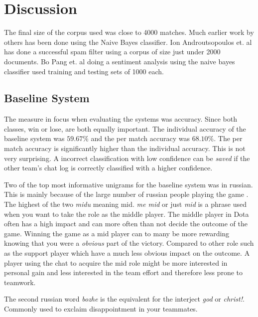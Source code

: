 \documentclass[12pt,a4paper]{article}
\begin{document}


\section{Discussion}
The final size of the corpus used was close to 4000 matches.
Much earlier work by others has been done using the Naive Bayes classifier.
Ion Androutsopoulos et. al \cite{spam} has done a successful
spam filter using a corpus of size just under 2000 documents.
Bo Pang et. al \cite{sentiment} doing a sentiment analysis
using the naive bayes classifier used training and testing sets of 1000 each.

\subsection{Baseline System}
The measure in focus when evaluating the systems was accuracy. Since both classes, win or lose,
are both equally important.
The individual accuracy of the baseline system was $59.67\%$ and the per match accuracy was $68.10\%$.
The per match accuracy is significantly higher than the individual accuracy.
This is not very surprising.
A incorrect classification with low confidence can be \textit{saved} if the other team's chat log
is correctly classified with a higher confidence.

Two of the top most informative unigrams for the baseline system was in russian.
This is mainly because of the large number of russian people playing the game \cite{ruski}.
The highest of the two \textit{midu} meaning mid. 
\textit{me mid} or just \textit{mid} is a phrase used when you want to take the role as the
middle player. The middle player in Dota often has a high impact and can more often than not
decide the outcome of the game. Winning the game as a mid player can to many be more rewarding
knowing that you were a \textit{obvious} part of the victory. Compared to other role such as
the support player which have a much less obvious impact on the outcome.
A player using the chat to acquire the mid role might be more interested in personal gain
and less interested in the team effort and therefore less prone to teamwork.

The second russian word \textit{bozhe} is the equivalent for the interject \textit{god} or \textit{christ!}.
Commonly used to exclaim disappointment in your teammates.
\end{document}
